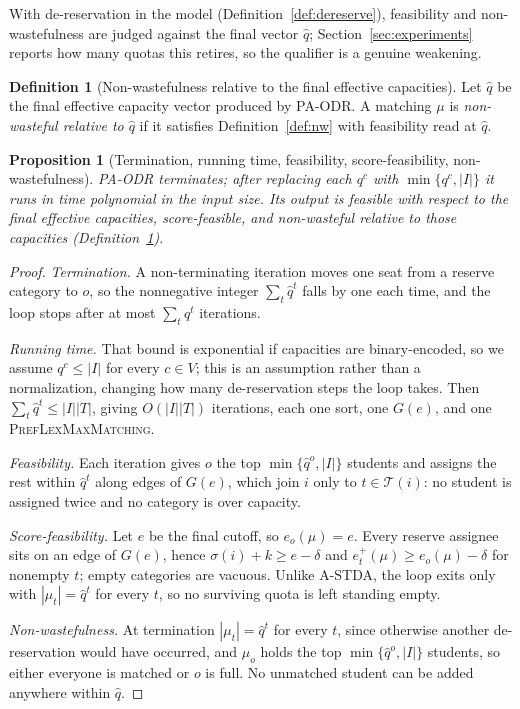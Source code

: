 \documentclass[a4paper,twoside]{article}
\newtheorem{proposition}{Proposition}
\theoremstyle{definition}
\newtheorem{definition}{Definition}
\renewcommand{\T}{\mathcal{T}}
\begin{document}
With de-reservation in the model (Definition~\ref{def:dereserve}), feasibility and non-wastefulness are judged against the final vector $\hat q$; Section~\ref{sec:experiments} reports how many quotas this retires, so the qualifier is a genuine weakening.

\begin{definition}[Non-wastefulness relative to the final effective capacities]
\label{def:nw-hat}
Let $\hat q$ be the final effective capacity vector produced by PA-ODR. A matching $\mu$ is \emph{non-wasteful relative to $\hat q$} if it satisfies Definition~\ref{def:nw} with feasibility read at $\hat q$.
\end{definition}

\begin{proposition}[Termination, running time, feasibility, score-feasibility, non-wastefulness]
\label{prop:paodr-basic}
PA-ODR terminates; after replacing each $q^c$ with $\min\{q^c,|I|\}$ it runs in time polynomial in the input size. Its output is feasible with respect to the final effective capacities, score-feasible, and non-wasteful relative to those capacities (Definition~\ref{def:nw-hat}).
\end{proposition}

\begin{proof}
\emph{Termination.} A non-terminating iteration moves one seat from a reserve category to $o$, so the nonnegative integer $\sum_t\hat q^t$ falls by one each time, and the loop stops after at most $\sum_t q^t$ iterations.

\emph{Running time.} That bound is exponential if capacities are binary-encoded, so we assume $q^c\le|I|$ for every $c\in V$; this is an assumption rather than a normalization, changing how many de-reservation steps the loop takes. Then $\sum_t\hat q^t\le|I||T|$, giving $O(|I||T|)$ iterations, each one sort, one $G(e)$, and one \textsc{PrefLexMaxMatching}.

\emph{Feasibility.} Each iteration gives $o$ the top $\min\{\hat q^o,|I|\}$ students and assigns the rest within $\hat q^t$ along edges of $G(e)$, which join $i$ only to $t\in\T(i)$: no student is assigned twice and no category is over capacity.

\emph{Score-feasibility.} Let $e$ be the final cutoff, so $e_o(\mu)=e$. Every reserve assignee sits on an edge of $G(e)$, hence $\sigma(i)+k\ge e-\delta$ and $e_t^+(\mu)\ge e_o(\mu)-\delta$ for nonempty $t$; empty categories are vacuous. Unlike A-STDA, the loop exits only with $|\mu_t|=\hat q^t$ for every $t$, so no surviving quota is left standing empty.

\emph{Non-wastefulness.} At termination $|\mu_t|=\hat q^t$ for every $t$, since otherwise another de-reservation would have occurred, and $\mu_o$ holds the top $\min\{\hat q^o,|I|\}$ students, so either everyone is matched or $o$ is full. No unmatched student can be added anywhere within $\hat q$.
\end{proof}
\end{document}
